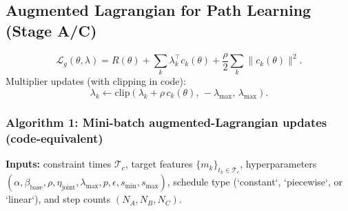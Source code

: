 \documentclass[11pt]{article}
\begin{document}
\subsection{Augmented Lagrangian for Path Learning (Stage A/C)}
\[
\mathcal{L}_g(\theta,\lambda)
=
R(\theta)
+ \sum_{k}\lambda_k^\top c_k(\theta)
+ \frac{\rho}{2}\sum_k \|c_k(\theta)\|^2.
\]
Multiplier updates (with clipping in code):
\[
\lambda_k \leftarrow
\mathrm{clip}\!\left(\lambda_k + \rho\,c_k(\theta),\,-\lambda_{\max},\,\lambda_{\max}\right).
\]

\subsubsection*{Algorithm 1: Mini-batch augmented-Lagrangian updates (code-equivalent)}
\textbf{Inputs:} constraint times $\mathcal{T}_c$, target features $\{m_k\}_{t_k\in\mathcal{T}_c}$, hyperparameters $(\alpha,\beta_{\mathrm{base}},\rho,\eta_{\mathrm{joint}},\lambda_{\max},p,\epsilon,s_{\min},s_{\max})$, schedule type (`constant`, `piecewise`, or `linear`), and step counts $(N_A,N_B,N_C)$.
\end{document}
